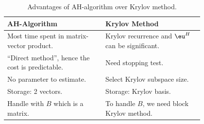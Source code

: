 \documentclass{article}
\begin{document}
\begin{table}[ht]
    \centering
    \caption{Advantages of AH-algorithm over Krylov method.}
    \begin{tabular}{p{0.4\linewidth}  p{0.4\linewidth}}
        \toprule
        AH-Algorithm  & Krylov Method \\ \midrule
        Most time spent in matrix-vector product. & Krylov recurrence
        and $\eu^H$ can be significant. \\
        ``Direct method'', hence the cost is predictable. & Need stopping test. \\
        No parameter to estimate. & Select Krylov subspace size.\\
        Storage: 2 vectors. & Storage: Krylov basis.\\
        Handle with $B$ which is a matrix. & To handle $B$, we need
        block Krylov method.\\ \bottomrule
    \end{tabular}
\end{table}






\end{document}
